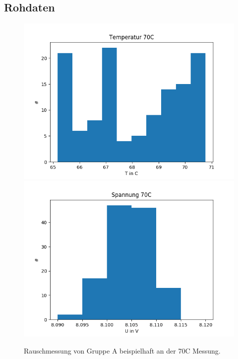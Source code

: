 \documentclass[12pt,a4paper]{article}
\begin{document}
\subsection{Rohdaten}
\begin{figure}
\includegraphics[scale=0.55]{Bilder/Rauschmessung_A_Temp.png}
\includegraphics[scale=0.55]{Bilder/Rauschmessung_A_Spannung.png}
\caption{Rauschmessung von Gruppe A beispielhaft an der 70C Messung.}
\label{fig:Rausch_A}
\end{figure}
\end{document}
